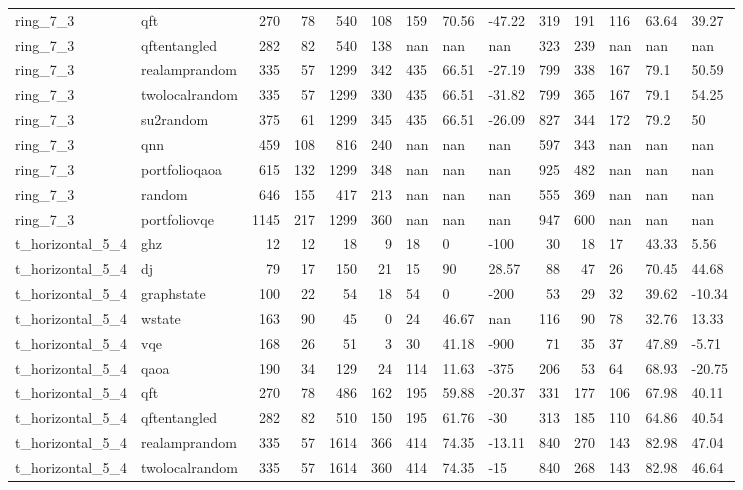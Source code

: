 \begin{longtable}{llrrrrlllrrlll}
ring\_7\_3 & qft & 270 & 78 & 540 & 108 & 159 & 70.56 & -47.22 & 319 & 191 & 116 & 63.64 & 39.27 \\
ring\_7\_3 & qftentangled & 282 & 82 & 540 & 138 & nan & nan & nan & 323 & 239 & nan & nan & nan \\
ring\_7\_3 & realamprandom & 335 & 57 & 1299 & 342 & 435 & 66.51 & -27.19 & 799 & 338 & 167 & 79.1 & 50.59 \\
ring\_7\_3 & twolocalrandom & 335 & 57 & 1299 & 330 & 435 & 66.51 & -31.82 & 799 & 365 & 167 & 79.1 & 54.25 \\
ring\_7\_3 & su2random & 375 & 61 & 1299 & 345 & 435 & 66.51 & -26.09 & 827 & 344 & 172 & 79.2 & 50 \\
ring\_7\_3 & qnn & 459 & 108 & 816 & 240 & nan & nan & nan & 597 & 343 & nan & nan & nan \\
ring\_7\_3 & portfolioqaoa & 615 & 132 & 1299 & 348 & nan & nan & nan & 925 & 482 & nan & nan & nan \\
ring\_7\_3 & random & 646 & 155 & 417 & 213 & nan & nan & nan & 555 & 369 & nan & nan & nan \\
ring\_7\_3 & portfoliovqe & 1145 & 217 & 1299 & 360 & nan & nan & nan & 947 & 600 & nan & nan & nan \\
t\_horizontal\_5\_4 & ghz & 12 & 12 & 18 & 9 & 18 & 0 & -100 & 30 & 18 & 17 & 43.33 & 5.56 \\
t\_horizontal\_5\_4 & dj & 79 & 17 & 150 & 21 & 15 & 90 & 28.57 & 88 & 47 & 26 & 70.45 & 44.68 \\
t\_horizontal\_5\_4 & graphstate & 100 & 22 & 54 & 18 & 54 & 0 & -200 & 53 & 29 & 32 & 39.62 & -10.34 \\
t\_horizontal\_5\_4 & wstate & 163 & 90 & 45 & 0 & 24 & 46.67 & nan & 116 & 90 & 78 & 32.76 & 13.33 \\
t\_horizontal\_5\_4 & vqe & 168 & 26 & 51 & 3 & 30 & 41.18 & -900 & 71 & 35 & 37 & 47.89 & -5.71 \\
t\_horizontal\_5\_4 & qaoa & 190 & 34 & 129 & 24 & 114 & 11.63 & -375 & 206 & 53 & 64 & 68.93 & -20.75 \\
t\_horizontal\_5\_4 & qft & 270 & 78 & 486 & 162 & 195 & 59.88 & -20.37 & 331 & 177 & 106 & 67.98 & 40.11 \\
t\_horizontal\_5\_4 & qftentangled & 282 & 82 & 510 & 150 & 195 & 61.76 & -30 & 313 & 185 & 110 & 64.86 & 40.54 \\
t\_horizontal\_5\_4 & realamprandom & 335 & 57 & 1614 & 366 & 414 & 74.35 & -13.11 & 840 & 270 & 143 & 82.98 & 47.04 \\
t\_horizontal\_5\_4 & twolocalrandom & 335 & 57 & 1614 & 360 & 414 & 74.35 & -15 & 840 & 268 & 143 & 82.98 & 46.64 \\

\end{longtable}
